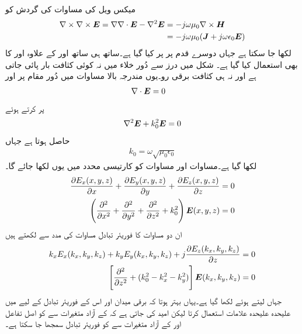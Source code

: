 میکس ویل کی مساوات  کی گردش کو
\begin{align*}
\nabla \times \nabla \times {\ensuremath{{\boldsymbol{E}}}}=\nabla \nabla \cdot {\ensuremath{{\boldsymbol{E}}}}-\nabla^2 {{\boldsymbol{E}}}&=-j \omega \mu_0 \nabla \times {\ensuremath{{\boldsymbol{H}}}} \\
&=-j \omega \mu_0 ({{\boldsymbol{J}}}+j \omega \epsilon_0 {{\boldsymbol{E}}})
\end{align*}
لکھا جا سکتا ہے جہاں دوسرے قدم پر  پر کیا گیا ہے۔ساتھ ہی ساتھ  اور  کے علاوہ  اور 
 کا بھی استعمال کیا گیا ہے۔ شکل  میں درز سے دُور خلاء میں نہ کوئی کثافت بار پائی جاتی ہے اور نہ ہی کثافت برقی رو۔یوں مندرجہ بالا مساوات میں دُور مقام پر  اور  
\begin{align}\label{مساوات_اینٹینا_فوریئر_الف}
\nabla \cdot {\ensuremath{{\boldsymbol{E}}}}&=0
\end{align}
پر کرتے ہوئے
\begin{align}\label{مساوات_اینٹینا_فوریئر_ب}
\nabla^2 {{\boldsymbol{E}}}+k_0^2 {{\boldsymbol{E}}}=0
\end{align}
حاصل ہوتا ہے جہاں
\begin{align}
k_0= \omega \sqrt{ \mu_0 \epsilon_0}
\end{align}
لکھا گیا ہے۔مساوات  اور مساوات  کو کارتیسی محدد میں یوں لکھا جائے گا۔
\begin{align}
\frac{\partial E_x(x,y,z)}{\partial x}+\frac{\partial E_y(x,y,z)}{\partial y}+\frac{\partial E_z(x,y,z)}{\partial z}&=0 \label{مساوات_اینٹینا_فوریئر_پ}\\
\left(\frac{\partial^2}{\partial x^2}+\frac{\partial^2}{\partial y^2}+\frac{\partial^2}{\partial z^2} +k_0^2\right) {{\boldsymbol{E}}}(x,y,z)&=0\label{مساوات_اینٹینا_فوریئر_ت}
\end{align}
ان دو مساوات کا فوریئر تبادل مساوات  کی مدد سے لکھتے ہیں
\begin{align}
k_x E_x(k_x,k_y,k_z)+k_y E_y(k_x,k_y,k_z)+j \frac{\partial E_z(k_x,k_y,k_z)}{\partial z}&=0\label{مساوات_اینٹینا_فوریئر_ٹ}\\
\left[\frac{\partial^2}{\partial z^2}+(k_0^2-k_x^2-k_y^2)\right] {\ensuremath{{\boldsymbol{E}}}}(k_x,k_y,k_z)&=0\label{مساوات_اینٹینا_فوریئر_ث}
\end{align}
 جہاں  لیتے ہوئے  لکھا گیا ہے۔یہاں بہتر ہوتا کہ برقی میدان اور اس کے فوریئر تبادل کے لیے میں علیحدہ علیحدہ علامات استعمال کرتا لیکن امید کی جاتی ہے کہ  کے آزاد متغیرات  سے  کو اصل تفاعل اور  کے آزاد متغیرات  سے    کو فوریئر تبادل سمجھا جا سکتا ہے۔

